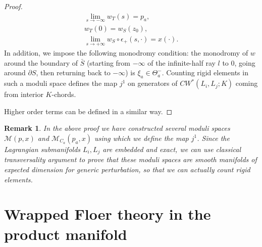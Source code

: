 \documentclass{amsart}
\newtheorem{remark}[theorem]{Remark}
\numberwithin{equation}{section}
\numberwithin{figure}{section}
\begin{document}
\begin{proof}
\begin{align*}
\lim\limits_{s \to -\infty} w_{T}(s) = p_{a},\\
w_{T}(0) = w_{S}(z_{0}),\\
\lim\limits_{s \to +\infty} w_{S} \circ \epsilon_{+}(s, \cdot) = x(\cdot).
\end{align*}
In addition, we impose the following monodromy condition: the monodromy of $w$ around the boundary of $\bar{S}$ (starting from $-\infty$ of the infinite-half ray $l$ to $0$, going around $\partial S$, then returning back to $-\infty$) is $\xi_{a} \in \Theta_{a}^{-}$. Counting rigid elements in such a moduli space defines the map $j^{1}$ on generators of $CW^{*}(L_{i}, L_{j}; K)$ coming from interior $K$-chords. \par
	Higher order terms can be defined in a similar way.
\end{proof}


\begin{remark}
	In the above proof we have constructed several moduli spaces $\mathcal{M}(p, x)$ and $\mathcal{M}_{C_{a}}(p_{a}, x)$ using which we define the map $j^{1}$. Since the Lagrangian submanifolds $L_{i}, L_{j}$ are embedded and exact, we can use classical transversality argument to prove that these moduli spaces are smooth manifolds of expected dimension for generic perturbation, so that we can actually count rigid elements. 
\end{remark}
	
\section{Wrapped Floer theory in the product manifold} \label{section: product manifolds}
\end{document}
